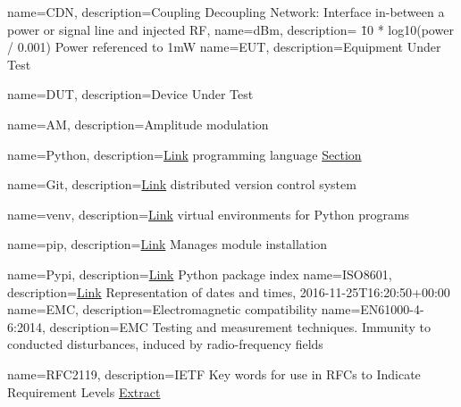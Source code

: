 

 {
  name={CDN},
  description={Coupling Decoupling Network: Interface in-between a power or signal line and injected RF},
}
 {
  name={dBm},
  description={ \= 10 * log10(power / 0.001) Power referenced to 1mW}
}
 {
  name={EUT},
  description={Equipment Under Test}
}

 {
  name={DUT},
  description={Device Under Test}
}

 {
  name={AM},
  description={Amplitude modulation}
}

 {
  name={Python},
  description={\href{https://www.python.org/}{Link} programming language \hyperref[sec:Python]{Section}}
}

 {
  name={Git},
  description={\href{https://git-scm.com}{Link} distributed version control system}
}

 {
  name={venv},
  description={\href{https://docs.python.org/3/library/venv.html}{Link} virtual environments for Python programs}
}

 {
  name={pip},
  description={\href{https://pypi.python.org/pypi/pip}{Link} Manages module installation}
}

 {
  name={Pypi},
  description={\href{https://pypi.python.org}{Link} Python package index}
}
 {
  name={ISO8601},
  description={\href{https://en.wikipedia.org/wiki/ISO_8601}{Link} Representation of dates and times, 2016-11-25T16:20:50+00:00}
}
 {
  name={EMC},
  description={Electromagnetic compatibility}
}
 {
  name={EN61000-4-6:2014},
  description={EMC Testing and measurement techniques. Immunity to conducted disturbances, induced by radio-frequency fields}
}

 {
  name={RFC2119},
  description={IETF Key words for use in RFCs to Indicate Requirement Levels \hyperref[sec:RFC2119]{Extract}}
}
